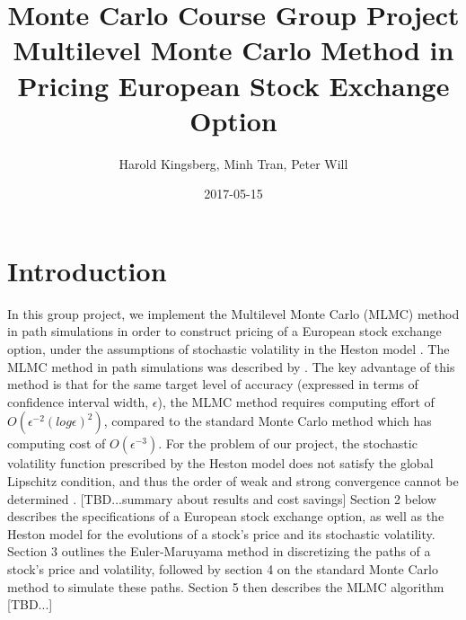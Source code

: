 \documentclass{article}
\title{Monte Carlo Course Group Project \\ 
Multilevel Monte Carlo Method in Pricing European Stock Exchange Option}
\date{2017-05-15}
\author{Harold Kingsberg, Minh Tran, Peter Will}
\begin{document}
\maketitle

\section{Introduction} 
In this group project, we implement the Multilevel Monte Carlo (MLMC) method in path simulations in order to construct pricing of a European stock exchange option, under the assumptions of stochastic volatility in the Heston model \cite{heston1993closed}. The MLMC method in path simulations was described by \cite{giles2008multilevel}. The key advantage of this method is that for the same target level of accuracy (expressed in terms of confidence interval width, $\epsilon$), the MLMC method requires computing effort of $O(\epsilon^{-2}(log\epsilon)^2)$, compared to the standard Monte Carlo method which has computing cost of $O(\epsilon^{-3})$. For the problem of our project, the stochastic volatility function prescribed by the Heston model does not satisfy the global Lipschitz condition, and thus the order of weak and strong convergence cannot be determined \cite{giles2008multilevel}. 
[TBD...summary about results and cost savings]
Section 2 below describes the specifications of a European stock exchange option, as well as the Heston model for the evolutions of a stock's price and its stochastic volatility. Section 3 outlines the Euler-Maruyama method in discretizing the paths of a stock's price and volatility, followed by section 4 on the standard Monte Carlo method to simulate these paths. Section 5 then describes the MLMC algorithm [TBD...]
\end{document}
